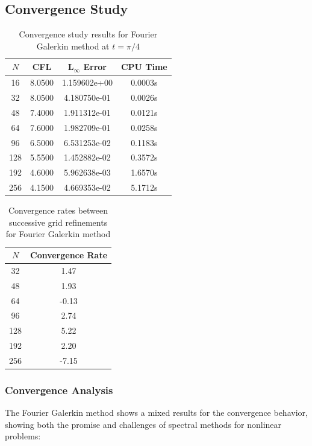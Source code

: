 \subsection{Convergence Study}
\begin{table}[h]
	\centering
	\begin{tabular}{|c|c|c|c|}
		\hline
		$N$ & CFL    & L$_\infty$ Error & CPU Time \\
		\hline
		16  & 8.0500 & 1.159602e+00     & 0.0003s  \\
		32  & 8.0500 & 4.180750e-01     & 0.0026s  \\
		48  & 7.4000 & 1.911312e-01     & 0.0121s  \\
		64  & 7.6000 & 1.982709e-01     & 0.0258s  \\
		96  & 6.5000 & 6.531253e-02     & 0.1183s  \\
		128 & 5.5500 & 1.452882e-02     & 0.3572s  \\
		192 & 4.6000 & 5.962638e-03     & 1.6570s  \\
		256 & 4.1500 & 4.669353e-02     & 5.1712s  \\
		\hline
	\end{tabular}
	\caption{Convergence study results for Fourier Galerkin method at $t = \pi/4$}
	\label{tab:convergence_galerkin}
\end{table}

\begin{table}[h]
	\centering
	\begin{tabular}{|c|c|}
		\hline
		$N$ & Convergence Rate \\
		\hline
		32  & 1.47             \\
		48  & 1.93             \\
		64  & -0.13            \\
		96  & 2.74             \\
		128 & 5.22             \\
		192 & 2.20             \\
		256 & -7.15            \\
		\hline
	\end{tabular}
	\caption{Convergence rates between successive grid refinements for Fourier Galerkin method}
	\label{tab:rates_galerkin}
\end{table}

\subsubsection{Convergence Analysis}
The Fourier Galerkin method shows a mixed results for the convergence behavior, showing both the promise and challenges of spectral methods for nonlinear problems:

